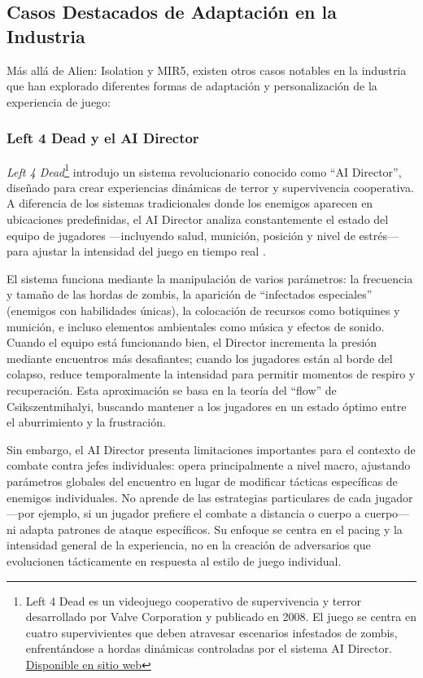 \documentclass[informe]{upropuesta}
\begin{document}
\subsection{Casos Destacados de Adaptación en la Industria}

Más allá de Alien: Isolation y MIR5, existen otros casos notables en la industria que han explorado diferentes formas de adaptación y personalización de la experiencia de juego:

\subsubsection*{Left 4 Dead y el AI Director}

\textit{Left 4 Dead}\footnote{Left 4 Dead es un videojuego cooperativo de supervivencia y terror desarrollado por Valve Corporation y publicado en 2008. El juego se centra en cuatro supervivientes que deben atravesar escenarios infestados de zombis, enfrentándose a hordas dinámicas controladas por el sistema AI Director. \href{https://www.l4d.com/}{Disponible en sitio web}} introdujo un sistema revolucionario conocido como ``AI Director'', diseñado para crear experiencias dinámicas de terror y supervivencia cooperativa. A diferencia de los sistemas tradicionales donde los enemigos aparecen en ubicaciones predefinidas, el AI Director analiza constantemente el estado del equipo de jugadores ---incluyendo salud, munición, posición y nivel de estrés--- para ajustar la intensidad del juego en tiempo real \cite{Booth09}.

El sistema funciona mediante la manipulación de varios parámetros: la frecuencia y tamaño de las hordas de zombis, la aparición de ``infectados especiales'' (enemigos con habilidades únicas), la colocación de recursos como botiquines y munición, e incluso elementos ambientales como música y efectos de sonido. Cuando el equipo está funcionando bien, el Director incrementa la presión mediante encuentros más desafiantes; cuando los jugadores están al borde del colapso, reduce temporalmente la intensidad para permitir momentos de respiro y recuperación. Esta aproximación se basa en la teoría del ``flow'' de Csikszentmihalyi, buscando mantener a los jugadores en un estado óptimo entre el aburrimiento y la frustración.

Sin embargo, el AI Director presenta limitaciones importantes para el contexto de combate contra jefes individuales: opera principalmente a nivel macro, ajustando parámetros globales del encuentro en lugar de modificar tácticas específicas de enemigos individuales. No aprende de las estrategias particulares de cada jugador ---por ejemplo, si un jugador prefiere el combate a distancia o cuerpo a cuerpo--- ni adapta patrones de ataque específicos. Su enfoque se centra en el pacing y la intensidad general de la experiencia, no en la creación de adversarios que evolucionen tácticamente en respuesta al estilo de juego individual.
\end{document}
